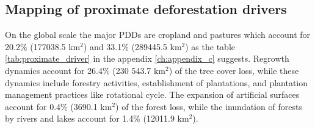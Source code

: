 		\subsection{Mapping of proximate deforestation drivers}
		\label{subsec:results_proxy_deforestation_drivers}
			On the global scale the major \acp{PDD} are cropland and pastures which account for 20.2\% (177038.5 km$^2$) and 33.1\% (289445.5 km$^2$) as the table \ref{tab:proximate_driver} in the appendix \ref{ch:appendix_c} suggests. Regrowth dynamics account for 26.4\% (230 543.7 km$^2$) of the tree cover loss, while these dynamics include forestry activities, establishment of plantations, and plantation management practices like rotational cycle. The expansion of artificial surfaces account for 0.4\% (3690.1 km$^2$) of the forest loss, while the inundation of forests by rivers and lakes account for 1.4\% (12011.9 km$^2$). 

